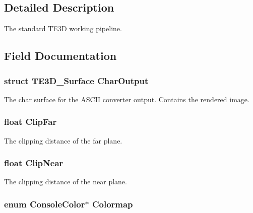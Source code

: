 \subsection{Detailed Description}
The standard T\-E3\-D working pipeline. 

\subsection{Field Documentation}
\hypertarget{struct_t_e3_d___pipeline_a4ccfa7cf1426da85d6f78d608c904ba4}{
\subsubsection[{Char\-Output}]{\setlength{\rightskip}{0pt plus 5cm}struct {\bf T\-E3\-D\-\_\-\-Surface} Char\-Output}}\label{struct_t_e3_d___pipeline_a4ccfa7cf1426da85d6f78d608c904ba4}
The char surface for the A\-S\-C\-I\-I converter output. Contains the rendered image. \hypertarget{struct_t_e3_d___pipeline_a5b41707833d27e2aff056a7ed6a0cb70}{
\subsubsection[{Clip\-Far}]{\setlength{\rightskip}{0pt plus 5cm}float Clip\-Far}}\label{struct_t_e3_d___pipeline_a5b41707833d27e2aff056a7ed6a0cb70}


The clipping distance of the far plane. 

\hypertarget{struct_t_e3_d___pipeline_a03426847bd37f9f0b28bc8da33d4db9d}{
\subsubsection[{Clip\-Near}]{\setlength{\rightskip}{0pt plus 5cm}float Clip\-Near}}\label{struct_t_e3_d___pipeline_a03426847bd37f9f0b28bc8da33d4db9d}


The clipping distance of the near plane. 

\hypertarget{struct_t_e3_d___pipeline_a5a84db4451cdf0fbed35c8951455ac20}{
\subsubsection[{Colormap}]{\setlength{\rightskip}{0pt plus 5cm}enum {\bf Console\-Color}$\ast$ Colormap}}\label{struct_t_e3_d___pipeline_a5a84db4451cdf0fbed35c8951455ac20}


